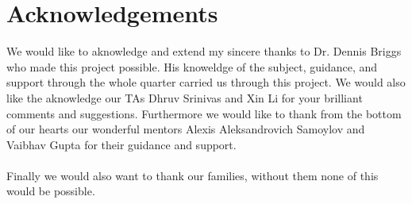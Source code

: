 \documentclass[12pt]{article}
\begin{document}
\section*{Acknowledgements}
We would like to aknowledge and extend my sincere thanks to Dr. Dennis Briggs who made this project possible.
His knoweldge of the subject, guidance, and support through the whole quarter carried us through this project.
We would also like the aknowledge our TAs Dhruv Srinivas and Xin Li for your brilliant comments and suggestions. Furthermore we 
would like to thank from the bottom of our hearts our wonderful mentors Alexis Aleksandrovich Samoylov and Vaibhav Gupta for their guidance and support.
\\\\
Finally we would also want to thank our families, without them none of this would be possible.
\pagebreak
\end{document}
